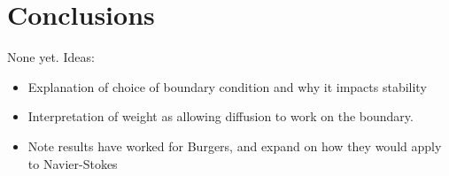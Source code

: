 \documentclass[11pt,onecolumn]{scrartcl}
\begin{document}
\section{Conclusions}
 
None yet.  Ideas:
\begin{itemize}
\item Explanation of choice of boundary condition and why it impacts stability
\item Interpretation of weight as allowing diffusion to work on the boundary.  
\item Note results have worked for Burgers, and expand on how they would apply to Navier-Stokes
\end{itemize} 
 



\end{document}
